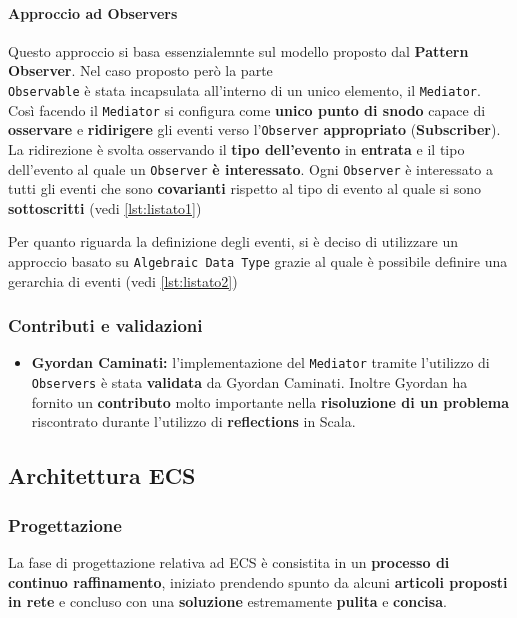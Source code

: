 \paragraph{Approccio ad Observers}
Questo approccio si basa essenzialemnte sul modello proposto dal \textbf{Pattern Observer}. Nel caso proposto però la parte\\ { }\texttt{Observable} è stata incapsulata all'interno di un unico elemento, il \texttt{Mediator}. Così facendo il \texttt{Mediator} si configura come \textbf{unico punto di snodo} capace di \textbf{osservare} e \textbf{ridirigere} gli eventi verso l'\texttt{Observer} \textbf{appropriato} (\textbf{Subscriber}). La ridirezione è svolta osservando il \textbf{tipo dell'evento} in \textbf{entrata} e il tipo dell'evento al quale un \texttt{Observer} \textbf{è interessato}. Ogni \texttt{Observer} è interessato a tutti gli eventi che sono \textbf{covarianti} rispetto al tipo di evento al quale si sono \textbf{sottoscritti} (vedi \ref{lst:listato1})



Per quanto riguarda la definizione degli eventi, si è deciso di utilizzare un approccio basato su \texttt{Algebraic Data Type} grazie al quale è possibile definire una gerarchia di eventi (vedi \ref{lst:listato2})



\subsubsection{Contributi e validazioni}
\begin{itemize}
	\item{\textbf{Gyordan Caminati:}} l'implementazione del \texttt{Mediator} tramite l'utilizzo di \texttt{Observers} è stata \textbf{validata} da Gyordan Caminati. Inoltre Gyordan ha fornito un \textbf{contributo} molto importante nella \textbf{risoluzione di un problema} riscontrato durante l'utilizzo di \textbf{reflections} in Scala. 
\end{itemize}


\subsection{Architettura ECS}
\label{subsec:arc_ecs}
\subsubsection{Progettazione}
La fase di progettazione relativa ad ECS è consistita in un \textbf{processo di continuo raffinamento}, iniziato prendendo spunto da alcuni \textbf{articoli proposti in rete} e concluso con una \textbf{soluzione} estremamente \textbf{pulita} e \textbf{concisa}. 

